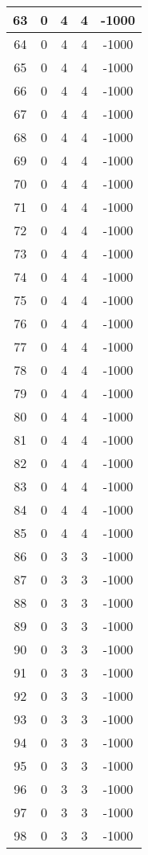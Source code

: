 \documentclass[letterpaper, 12pt]{article}
\begin{document}
\begin{longtable}{|c|c|c|c|c|}
\hline
63 & 0 & 4 & 4 & -1000 \\
\hline
64 & 0 & 4 & 4 & -1000 \\
\hline
65 & 0 & 4 & 4 & -1000 \\
\hline
66 & 0 & 4 & 4 & -1000 \\
\hline
67 & 0 & 4 & 4 & -1000 \\
\hline
68 & 0 & 4 & 4 & -1000 \\
\hline
69 & 0 & 4 & 4 & -1000 \\
\hline
70 & 0 & 4 & 4 & -1000 \\
\hline
71 & 0 & 4 & 4 & -1000 \\
\hline
72 & 0 & 4 & 4 & -1000 \\
\hline
73 & 0 & 4 & 4 & -1000 \\
\hline
74 & 0 & 4 & 4 & -1000 \\
\hline
75 & 0 & 4 & 4 & -1000 \\
\hline
76 & 0 & 4 & 4 & -1000 \\
\hline
77 & 0 & 4 & 4 & -1000 \\
\hline
78 & 0 & 4 & 4 & -1000 \\
\hline
79 & 0 & 4 & 4 & -1000 \\
\hline
80 & 0 & 4 & 4 & -1000 \\
\hline
81 & 0 & 4 & 4 & -1000 \\
\hline
82 & 0 & 4 & 4 & -1000 \\
\hline
83 & 0 & 4 & 4 & -1000 \\
\hline
84 & 0 & 4 & 4 & -1000 \\
\hline
85 & 0 & 4 & 4 & -1000 \\
\hline
86 & 0 & 3 & 3 & -1000 \\
\hline
87 & 0 & 3 & 3 & -1000 \\
\hline
88 & 0 & 3 & 3 & -1000 \\
\hline
89 & 0 & 3 & 3 & -1000 \\
\hline
90 & 0 & 3 & 3 & -1000 \\
\hline
91 & 0 & 3 & 3 & -1000 \\
\hline
92 & 0 & 3 & 3 & -1000 \\
\hline
93 & 0 & 3 & 3 & -1000 \\
\hline
94 & 0 & 3 & 3 & -1000 \\
\hline
95 & 0 & 3 & 3 & -1000 \\
\hline
96 & 0 & 3 & 3 & -1000 \\
\hline
97 & 0 & 3 & 3 & -1000 \\
\hline
98 & 0 & 3 & 3 & -1000 \\

\end{longtable}
\end{document}
